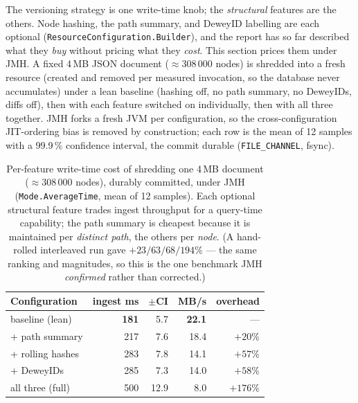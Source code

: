 \documentclass[11pt,a4paper,oneside]{report}
\theoremstyle{sirixthm}
\newcommand{\code}[1]{\texttt{#1}}
\begin{document}
The versioning strategy is one write-time knob; the \emph{structural} features are the others. Node
hashing, the path summary, and DeweyID labelling are each optional
(\code{ResourceConfiguration.Builder}), and the report has so far described what they \emph{buy} without
pricing what they \emph{cost}. This section prices them under JMH. A fixed 4\,MB JSON document
($\approx$308\,000 nodes) is shredded into a fresh resource (created and removed per measured invocation,
so the database never accumulates) under a lean baseline (hashing off, no path summary, no DeweyIDs, diffs
off), then with each feature switched on individually, then with all three together. JMH forks a fresh JVM
per configuration, so the cross-configuration JIT-ordering bias is removed by construction; each row is the
mean of 12 samples with a 99.9\,\% confidence interval, the commit durable (\code{FILE\_CHANNEL}, fsync).

\begin{table}[h]
\centering\footnotesize\setlength{\tabcolsep}{8pt}\renewcommand{\arraystretch}{1.25}
\begin{tabular}{@{}l r r r r@{}}
\toprule
\textbf{Configuration} & \textbf{ingest ms} & \textbf{$\pm$CI} & \textbf{MB/s} & \textbf{overhead}\\
\midrule
baseline (lean)        & \textbf{181}  & 5.7  & \textbf{22.1} & ---\\
\quad+ path summary    & 217  & 7.6  & 18.4 & $+20\%$\\
\quad+ rolling hashes  & 283  & 7.8  & 14.1 & $+57\%$\\
\quad+ DeweyIDs        & 285  & 7.3  & 14.0 & $+58\%$\\
all three (full)       & 500  & 12.9 & 8.0  & $+176\%$\\
\bottomrule
\end{tabular}
\caption{Per-feature write-time cost of shredding one 4\,MB document ($\approx$308\,000 nodes), durably
committed, under JMH (\code{Mode.AverageTime}, mean of 12 samples). Each optional structural feature trades
ingest throughput for a query-time capability; the path summary is cheapest because it is maintained per
\emph{distinct path}, the others per \emph{node}. (A hand-rolled interleaved run gave $+23/63/68/194\%$ ---
the same ranking and magnitudes, so this is the one benchmark JMH \emph{confirmed} rather than corrected.)}
\label{tab:ingestcost}
\end{table}
\end{document}

